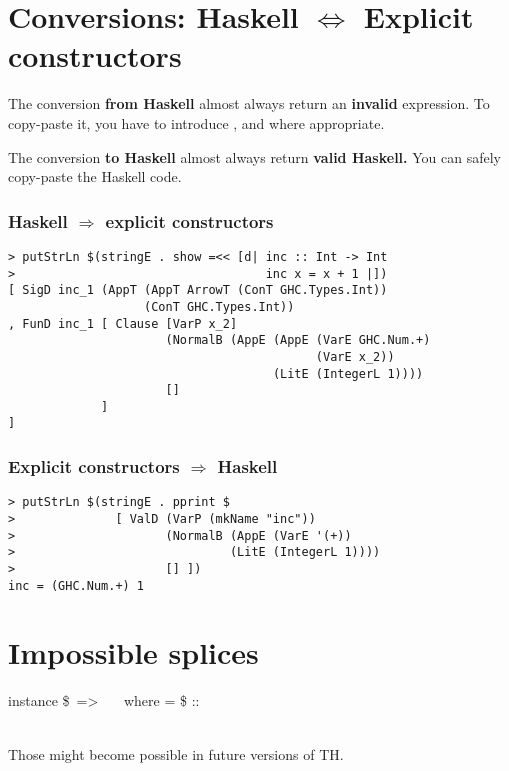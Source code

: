 \documentclass{refcard}
\begin{document}
\newpage
\section{Conversions: Haskell $\Leftrightarrow$ Explicit constructors}

The conversion \textbf{from Haskell} almost always return an \textbf{invalid}
expression. To copy-paste it, you have to introduce ,  and
 where appropriate.

\noindent
The conversion \textbf{to Haskell} almost always return \textbf{valid Haskell.}
You can safely copy-paste the Haskell code.


\subsubsection{Haskell $\Rightarrow$ explicit constructors}

\begin{verbatim}
> putStrLn $(stringE . show =<< [d| inc :: Int -> Int
>                                   inc x = x + 1 |])
[ SigD inc_1 (AppT (AppT ArrowT (ConT GHC.Types.Int))
                   (ConT GHC.Types.Int))
, FunD inc_1 [ Clause [VarP x_2]
                      (NormalB (AppE (AppE (VarE GHC.Num.+)
                                           (VarE x_2))
                                     (LitE (IntegerL 1))))
                      []
             ]
]
\end{verbatim}

\subsubsection{Explicit constructors $\Rightarrow$ Haskell}
\begin{verbatim}
> putStrLn $(stringE . pprint $
>              [ ValD (VarP (mkName "inc"))
>                     (NormalB (AppE (VarE '(+))
>                              (LitE (IntegerL 1))))
>                     [] ])
inc = (GHC.Num.+) 1
\end{verbatim}


\section{Impossible splices}

\begin{ldesc}
instance \$~=>~  \li
~~where  = 
\$ ::~
\end{ldesc} \\[1ex]
Those might become possible in future versions of TH.
\end{document}
